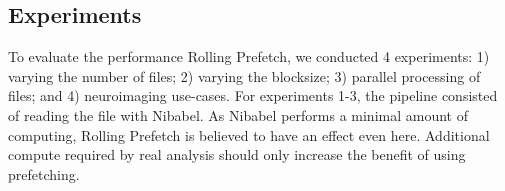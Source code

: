 \documentclass[conference]{IEEEtran}
\begin{document}



\subsection{Experiments}
To evaluate the performance Rolling Prefetch, we conducted 4 experiments: 1) varying
the number of files; 2) varying the blocksize; 3) parallel processing of files;  and 4) neuroimaging use-cases. For experiments 1-3, the pipeline consisted of reading the file with Nibabel. As Nibabel
performs a minimal amount of computing, Rolling Prefetch is believed to have an effect even here. Additional compute required
by real analysis should only increase the benefit of using prefetching.
\end{document}
